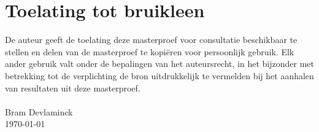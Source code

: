 \chapter*{Toelating tot bruikleen}

De auteur geeft de toelating deze masterproef voor consultatie beschikbaar te stellen en delen van de masterproef te kopiëren voor persoonlijk gebruik.
Elk ander gebruik valt onder de bepalingen van het auteursrecht, in het bijzonder met betrekking tot de verplichting de bron uitdrukkelijk te vermelden bij het aanhalen van resultaten uit deze masterproef.
\\ \\
Bram Devlaminck \\ \today
